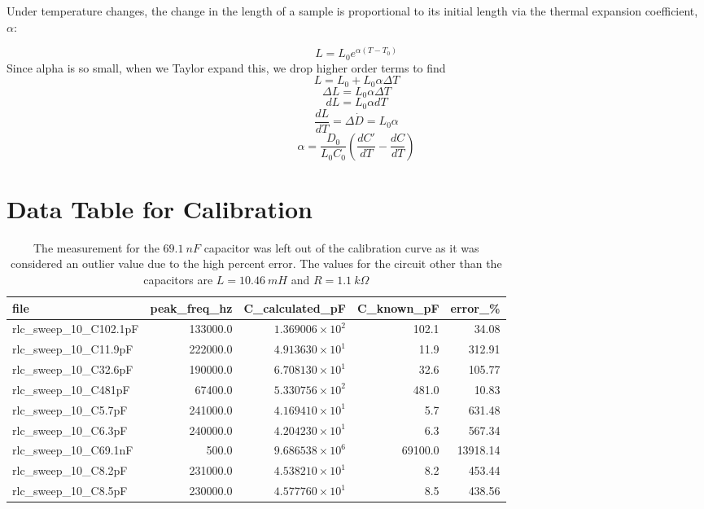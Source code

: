 \documentclass[letterpaper,12pt]{article}
\begin{document}
Under temperature changes, the change in the length of a sample is proportional to its initial length via the thermal expansion coefficient, $\alpha$:

\[
L = L_0e^{\alpha(T-T_0)}
\]
Since alpha is so small, when we Taylor expand this, we drop higher order terms to find
\[
L = L_0 + L_0\alpha\Delta T
\]
\[\Delta L = L_0\alpha\Delta T\]
\[
dL=L_0\alpha dT
\]
\[
\frac{dL}{dT}=\Delta \dot D=L_0\alpha
\]
\[
\alpha =\frac{D_0}{L_0C_0}\left (\frac{dC'}{dT}-\frac{dC}{dT}\right)
\]
\label{derivation}

\section{Data Table for Calibration}

\begin{table}[H]
\centering
\begin{tabular}{lrrrr}
\toprule
\textbf{file} & \textbf{peak\_freq\_hz} & \textbf{C\_calculated\_pF} & \textbf{C\_known\_pF} & \textbf{error\_\%} \\ 
\midrule
rlc\_sweep\_10\_C102.1pF & 133000.0 & $1.369006 \times 10^{2}$ & 102.1 & 34.08 \\ 
rlc\_sweep\_10\_C11.9pF  & 222000.0 & $4.913630 \times 10^{1}$ & 11.9 & 312.91 \\ 
rlc\_sweep\_10\_C32.6pF  & 190000.0 & $6.708130 \times 10^{1}$ & 32.6 & 105.77 \\ 
rlc\_sweep\_10\_C481pF   & 67400.0  & $5.330756 \times 10^{2}$ & 481.0 & 10.83 \\ 
rlc\_sweep\_10\_C5.7pF   & 241000.0 & $4.169410 \times 10^{1}$ & 5.7 & 631.48 \\ 
rlc\_sweep\_10\_C6.3pF   & 240000.0 & $4.204230 \times 10^{1}$ & 6.3 & 567.34 \\ 
rlc\_sweep\_10\_C69.1nF  & 500.0    & $9.686538 \times 10^{6}$ & 69100.0 & 13918.14 \\ 
rlc\_sweep\_10\_C8.2pF   & 231000.0 & $4.538210 \times 10^{1}$ & 8.2 & 453.44 \\ 
rlc\_sweep\_10\_C8.5pF   & 230000.0 & $4.577760 \times 10^{1}$ & 8.5 & 438.56 \\ 
\bottomrule
\end{tabular}
\caption{The measurement for the $69.1\ nF$ capacitor was left out of the calibration curve as it was considered an outlier value due to the high percent error. The values for the circuit other than the capacitors are $L=10.46\ mH$ and $R=1.1\ k\Omega$}
\label{tab:rlc_data}
\end{table}
\label{reso_cali}
\end{document}
